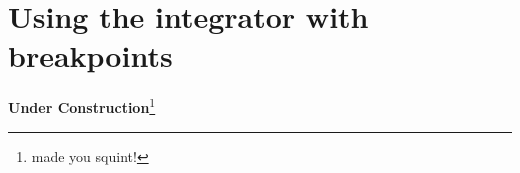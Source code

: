 \newpage
\section{Using the integrator with breakpoints}
\label{sec:app_integrator}

{\bf \large \hspace{4.5cm} Under Construction}\footnote{\tiny made you squint!}
